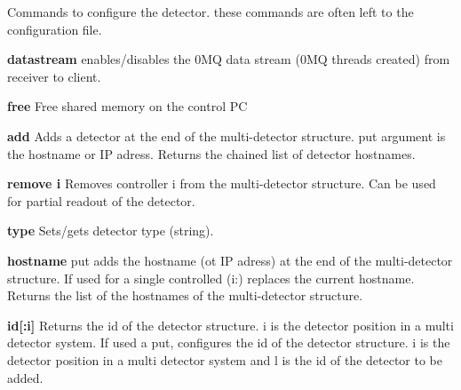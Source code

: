 Commands to configure the detector. these commands are often left to the configuration file.


\begin{DoxyItemize}
\item {\bfseries datastream} enables/disables the 0MQ data stream (0MQ threads created) from receiver to client.
\end{DoxyItemize}


\begin{DoxyItemize}
\item {\bfseries free} Free shared memory on the control PC
\end{DoxyItemize}


\begin{DoxyItemize}
\item {\bfseries add} Adds a detector at the end of the multi-\/detector structure. {\ttfamily put} argument is the hostname or IP adress. Returns the chained list of detector hostnames.
\end{DoxyItemize}


\begin{DoxyItemize}
\item {\bfseries remove i} Removes controller {\ttfamily i} from the multi-\/detector structure. Can be used for partial readout of the detector.
\end{DoxyItemize}


\begin{DoxyItemize}
\item {\bfseries type} Sets/gets detector type (string).
\end{DoxyItemize}


\begin{DoxyItemize}
\item {\bfseries hostname} {\ttfamily put} adds the hostname (ot IP adress) at the end of the multi-\/detector structure. If used for a single controlled (i:) replaces the current hostname. Returns the list of the hostnames of the multi-\/detector structure.
\end{DoxyItemize}


\begin{DoxyItemize}
\item {\bfseries id\mbox{[}:i\mbox{]}} Returns the id of the detector structure. i is the detector position in a multi detector system. If used a {\ttfamily put}, configures the id of the detector structure. i is the detector position in a multi detector system and l is the id of the detector to be added.
\end{DoxyItemize}


